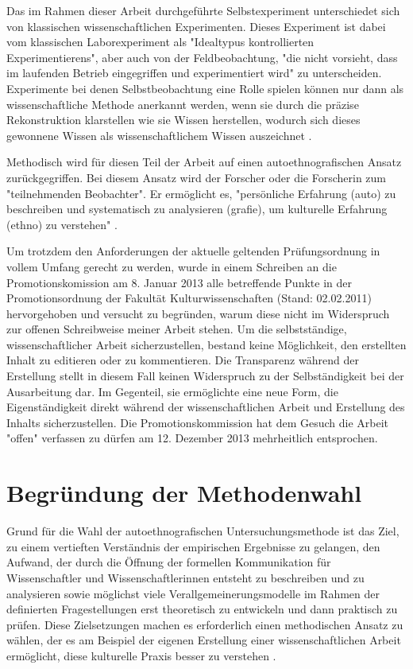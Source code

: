 Das im Rahmen dieser Arbeit durchgeführte Selbstexperiment unterschiedet sich von klassischen wissenschaftlichen Experimenten. Dieses Experiment ist dabei vom klassischen Laborexperiment als "Idealtypus kontrollierten Experimentierens", aber auch von der Feldbeobachtung, "die nicht vorsieht, dass im laufenden Betrieb eingegriffen und experimentiert wird" \cite{FQS196} zu unterscheiden. Experimente bei denen Selbstbeobachtung eine Rolle spielen können nur dann als wissenschaftliche Methode anerkannt werden, wenn sie durch die präzise Rekonstruktion klarstellen wie sie Wissen herstellen, wodurch sich dieses gewonnene Wissen als wissenschaftlichem Wissen auszeichnet \cite{solhdju_2011_selbstexperimente}.

Methodisch wird für diesen Teil der Arbeit auf einen autoethnografischen Ansatz zurückgegriffen. Bei diesem Ansatz wird der Forscher oder die Forscherin zum "teilnehmenden Beobachter". Er ermöglicht es, "persönliche Erfahrung (auto) zu beschreiben und systematisch zu analysieren (grafie), um kulturelle Erfahrung (ethno) zu verstehen" \cite{Ellis_2010}.

Um trotzdem den Anforderungen der aktuelle geltenden Prüfungsordnung in vollem Umfang gerecht zu werden, wurde in einem Schreiben an die Promotionskomission am 8. Januar 2013 alle betreffende Punkte in der Promotionsordnung der Fakultät Kulturwissenschaften (Stand: 02.02.2011) hervorgehoben und versucht zu begründen, warum diese nicht im Widerspruch zur offenen Schreibweise meiner Arbeit stehen. Um die selbstständige, wissenschaftlicher Arbeit sicherzustellen, bestand keine Möglichkeit, den erstellten Inhalt zu editieren oder zu kommentieren. Die Transparenz während der Erstellung stellt in diesem Fall keinen Widerspruch zu der Selbständigkeit bei der Ausarbeitung dar. Im Gegenteil, sie ermöglichte eine neue Form, die Eigenständigkeit direkt während der wissenschaftlichen Arbeit und Erstellung des Inhalts sicherzustellen. Die Promotionskommission hat dem Gesuch die Arbeit "offen" verfassen zu dürfen am 12. Dezember 2013 mehrheitlich entsprochen.

\section{Begründung der Methodenwahl}

Grund für die Wahl der autoethnografischen Untersuchungsmethode ist das Ziel, zu einem vertieften Verständnis der empirischen Ergebnisse zu gelangen, den Aufwand, der durch die Öffnung der formellen Kommunikation für Wissenschaftler und Wissenschaftlerinnen entsteht zu beschreiben und zu analysieren sowie möglichst viele Verallgemeinerungsmodelle im Rahmen der definierten Fragestellungen erst theoretisch zu entwickeln und dann praktisch zu prüfen. Diese Zielsetzungen machen es erforderlich einen methodischen Ansatz zu wählen, der es am Beispiel der eigenen Erstellung einer wissenschaftlichen Arbeit ermöglicht, diese kulturelle Praxis besser zu verstehen \cite{maso_2001_phenomenology}.

